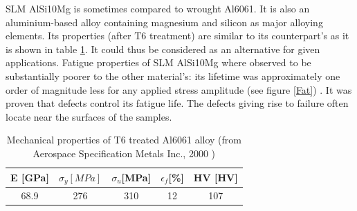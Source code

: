  \begin{center}
\begin{table}[ht]
\noindent{}
\caption[Mechanical properties for different plate pre heating temperatures.]{Mechanical properties for different plate pre heating temperatures (from Wang et al., 2018) \parencite{Wang2018}.}
\label{tab:Wang}
\end{table}
 \end{center}

SLM AlSi10Mg is sometimes compared to wrought Al6061. It is also an aluminium-based alloy containing magnesium and silicon as major alloying elements. Its properties (after T6 treatment) are similar to its counterpart's as it is shown in table \ref{tab:6061}. It could thus be considered as an alternative for given applications. Fatigue properties of SLM AlSi10Mg where observed to be substantially poorer to the other material's: its lifetime was approximately one order of magnitude less for any applied stress amplitude (see figure \ref{Fat}) \parencite{MOWER2016198}. It was proven that defects control its fatigue life. The defects giving rise to failure often locate near the surfaces of the samples. %
\\

 \begin{center}
\begin{table}[ht]
\centering
\begin{tabular}{|c|c|c|c|c|}
    \hline
    E [GPa] &$\sigma_y [MPa]$ &$\sigma_u$[MPa]&$\epsilon_f$[\%]&HV [HV] \\
\hline
\hline   
    68.9 &276  & 310 &12 &107	\\
    \hline

\end{tabular}
\caption[Mechanical properties of T6 treated Al6061 alloy]{Mechanical properties of T6 treated Al6061 alloy (from Aerospace Specification Metals Inc., 2000 \parencite{6061}) }
\label{tab:6061}
\end{table}
 \end{center}
 
